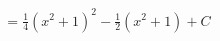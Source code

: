 \documentclass[preview]{standalone}
\begin{document}
\begin{align*}
= \frac{1}{4} (x^2 + 1)^2 - \frac{1}{2} (x^2 + 1) + C
\end{align*}
\end{document}
